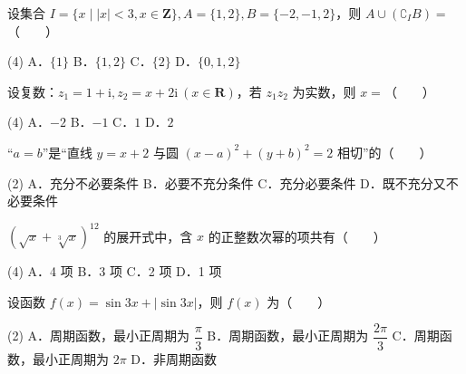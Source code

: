 

\begin{question}
设集合 $I = \{x \mid |x| < 3, x \in \mathbf{Z}\}, A = \{1, 2\}, B = \{-2, -1, 2\}$，则 $A \cup (\complement_I B) =$\mbox{（　　）}

\begin{gkopts}(4)
\task A．$\{1\}$
\task B．$\{1, 2\}$
\task C．$\{2\}$
\task D．$\{0, 1, 2\}$
\end{gkopts}

\end{question}
\begin{question}
设复数：$z_1 = 1 + \mathrm{i}, z_2 = x + 2\mathrm{i}\ (x \in \mathbf{R})$，若 $z_1 z_2$ 为实数，则 $x =$\mbox{（　　）}

\begin{gkopts}(4)
\task A．$-2$
\task B．$-1$
\task C．$1$
\task D．$2$
\end{gkopts}

\end{question}
\begin{question}
“$a = b$”是“直线 $y = x + 2$ 与圆 $(x - a)^2 + (y + b)^2 = 2$ 相切”的\mbox{（　　）}

\begin{gkopts}(2)
\task A．充分不必要条件
\task B．必要不充分条件
\task C．充分必要条件
\task D．既不充分又不必要条件
\end{gkopts}

\end{question}
\begin{question}
$(\sqrt{x} + \sqrt[3]{x})^{12}$ 的展开式中，含 $x$ 的正整数次幂的项共有\mbox{（　　）}

\begin{gkopts}(4)
\task A．4 项
\task B．3 项
\task C．2 项
\task D．1 项
\end{gkopts}

\end{question}
\begin{question}
设函数 $f(x) = \sin 3x + |\sin 3x|$，则 $f(x)$ 为\mbox{（　　）}

\begin{gkopts}(2)
\task A．周期函数，最小正周期为 $\dfrac{\pi}{3}$
\task B．周期函数，最小正周期为 $\dfrac{2\pi}{3}$
\task C．周期函数，最小正周期为 $2\pi$
\task D．非周期函数
\end{gkopts}

\end{question}
